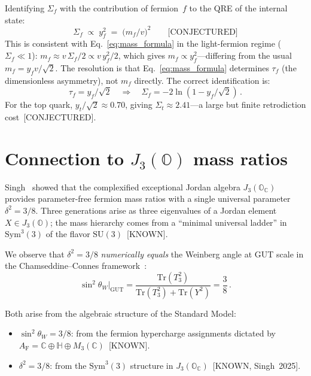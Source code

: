 \documentclass[prl,twocolumn,superscriptaddress,longbibliography]{revtex4-2}
\newcommand{\Tr}{\mathrm{Tr}}
\newcommand{\AF}{A_{\mathrm{F}}}
\newcommand{\JO}{J_3(\mathbb{O})}
\begin{document}
Identifying $\Sigma_f$ with the contribution of
fermion~$f$ to the QRE of the internal state:
\begin{equation}\label{eq:Sigma_Yukawa}
  \Sigma_f \;\propto\; y_f^2
  \;=\; \bigl(m_f/v\bigr)^2
  \qquad\text{[CONJECTURED]}
\end{equation}
This is consistent with Eq.~\eqref{eq:mass_formula}
in the light-fermion regime ($\Sigma_f \ll 1$):
$m_f \approx v\,\Sigma_f/2 \propto v\, y_f^2/2$,
which gives $m_f \propto y_f^2$---differing from
the usual $m_f = y_f v/\sqrt{2}$.
The resolution is that
Eq.~\eqref{eq:mass_formula} determines $\tau_f$
(the dimensionless asymmetry), not $m_f$ directly.
The correct identification is:
\begin{equation}\label{eq:tau_y}
  \tau_f = y_f / \sqrt{2}
  \quad\Longrightarrow\quad
  \Sigma_f = -2\ln(1 - y_f/\sqrt{2})\,.
\end{equation}
For the top quark, $y_t/\sqrt{2} \approx 0.70$,
giving $\Sigma_t \approx 2.41$---a large but finite
retrodiction cost~[CONJECTURED].


\section{Connection to $J_3(\mathbb{O})$ mass ratios}
\label{sec:J3O}

Singh~\cite{Singh2025} showed that the complexified
exceptional Jordan algebra $J_3(\mathbb{O}_\mathbb{C})$
provides parameter-free fermion mass ratios with a
single universal parameter $\delta^2 = 3/8$.
Three generations arise as three eigenvalues of a Jordan
element $X \in \JO$; the mass hierarchy comes from a
``minimal universal ladder'' in $\mathrm{Sym}^3(3)$
of the flavor $\mathrm{SU}(3)$~[KNOWN].

We observe that $\delta^2 = 3/8$ \emph{numerically
equals} the Weinberg angle at GUT scale in the
Chamseddine--Connes framework~\cite{CC1996}:
\begin{equation}\label{eq:38}
  \sin^2\theta_W\big|_{\mathrm{GUT}}
  = \frac{\Tr(T_3^2)}{\Tr(T_3^2) + \Tr(Y^2)}
  = \frac{3}{8}\,.
\end{equation}

Both arise from the algebraic structure of the
Standard Model:
\begin{itemize}
\item $\sin^2\theta_W = 3/8$: from the fermion
  hypercharge assignments dictated by
  $\AF = \mathbb{C} \oplus \mathbb{H}
  \oplus M_3(\mathbb{C})$~[KNOWN].
\item $\delta^2 = 3/8$: from the
  $\mathrm{Sym}^3(3)$ structure in
  $J_3(\mathbb{O}_\mathbb{C})$~[KNOWN,
  Singh~2025].
\end{itemize}
\end{document}
